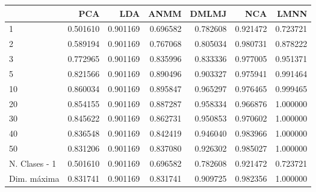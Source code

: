 \begin{tabular}{lrrrrrr}
\toprule
{} &       PCA &       LDA &      ANMM &     DMLMJ &       NCA &      LMNN \\
\midrule
1             &  0.501610 &  0.901169 &  0.696582 &  0.782608 &  0.921472 &  0.723721 \\
2             &  0.589194 &  0.901169 &  0.767068 &  0.805034 &  0.980731 &  0.878222 \\
3             &  0.772965 &  0.901169 &  0.835996 &  0.833336 &  0.977005 &  0.951371 \\
5             &  0.821566 &  0.901169 &  0.890496 &  0.903327 &  0.975941 &  0.991464 \\
10            &  0.860034 &  0.901169 &  0.895847 &  0.965297 &  0.976465 &  0.999465 \\
20            &  0.854155 &  0.901169 &  0.887287 &  0.958334 &  0.966876 &  1.000000 \\
30            &  0.845622 &  0.901169 &  0.862731 &  0.950853 &  0.970602 &  1.000000 \\
40            &  0.836548 &  0.901169 &  0.842419 &  0.946040 &  0.983966 &  1.000000 \\
50            &  0.831206 &  0.901169 &  0.837080 &  0.926302 &  0.985027 &  1.000000 \\
N. Clases - 1 &  0.501610 &  0.901169 &  0.696582 &  0.782608 &  0.921472 &  0.723721 \\
Dim. máxima   &  0.831741 &  0.901169 &  0.831741 &  0.909725 &  0.982356 &  1.000000 \\
\bottomrule
\end{tabular}
